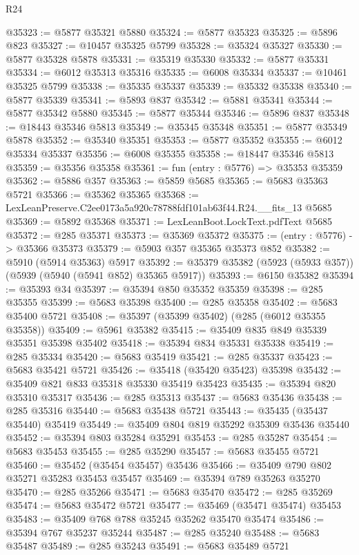 \begin{lexlean}{R24}
\begin{coremodule}
@35323 := @5877 @35321 @5880
@35324 := @5877 @35323
@35325 := @5896 @823
@35327 := @10457 @35325 @5799
@35328 := @35324 @35327
@35330 := @5877 @35328 @5878
@35331 := @35319 @35330
@35332 := @5877 @35331
@35334 := @6012 @35313 @35316
@35335 := @6008 @35334
@35337 := @10461 @35325 @5799
@35338 := @35335 @35337
@35339 := @35332 @35338
@35340 := @5877 @35339
@35341 := @5893 @837
@35342 := @5881 @35341
@35344 := @5877 @35342 @5880
@35345 := @5877 @35344
@35346 := @5896 @837
@35348 := @18443 @35346 @5813
@35349 := @35345 @35348
@35351 := @5877 @35349 @5878
@35352 := @35340 @35351
@35353 := @5877 @35352
@35355 := @6012 @35334 @35337
@35356 := @6008 @35355
@35358 := @18447 @35346 @5813
@35359 := @35356 @35358
@35361 := fun (entry : @5776) => @35353 @35359
@35362 := @5886 @357
@35363 := @5859 @5685
@35365 := @5683 @35363 @5721
@35366 := @35362 @35365
@35368 := LexLeanPreserve.C2ee0173a5a920c78788fdf101ab63f44.R24.__fits_13 @5685
@35369 := @5892 @35368
@35371 := LexLeanBoot.LockText.pdfText @5685
@35372 := @285 @35371
@35373 := @35369 @35372
@35375 := (entry : @5776) -> @35366 @35373
@35379 := @5903 @357 @35365 @35373 @852
@35382 := @5910 (@5914 @35363) @5917
@35392 := @35379 @35382 (@5923 (@5933 @357)) (@5939 (@5940 (@5941 @852) @35365 @5917))
@35393 := @6150 @35382
@35394 := @35393 @34
@35397 := @35394 @850 @35352 @35359
@35398 := @285 @35355
@35399 := @5683 @35398
@35400 := @285 @35358
@35402 := @5683 @35400 @5721
@35408 := @35397 (@35399 @35402) (@285 (@6012 @35355 @35358))
@35409 := @5961 @35382
@35415 := @35409 @835 @849 @35339 @35351 @35398 @35402
@35418 := @35394 @834 @35331 @35338
@35419 := @285 @35334
@35420 := @5683 @35419
@35421 := @285 @35337
@35423 := @5683 @35421 @5721
@35426 := @35418 (@35420 @35423) @35398
@35432 := @35409 @821 @833 @35318 @35330 @35419 @35423
@35435 := @35394 @820 @35310 @35317
@35436 := @285 @35313
@35437 := @5683 @35436
@35438 := @285 @35316
@35440 := @5683 @35438 @5721
@35443 := @35435 (@35437 @35440) @35419
@35449 := @35409 @804 @819 @35292 @35309 @35436 @35440
@35452 := @35394 @803 @35284 @35291
@35453 := @285 @35287
@35454 := @5683 @35453
@35455 := @285 @35290
@35457 := @5683 @35455 @5721
@35460 := @35452 (@35454 @35457) @35436
@35466 := @35409 @790 @802 @35271 @35283 @35453 @35457
@35469 := @35394 @789 @35263 @35270
@35470 := @285 @35266
@35471 := @5683 @35470
@35472 := @285 @35269
@35474 := @5683 @35472 @5721
@35477 := @35469 (@35471 @35474) @35453
@35483 := @35409 @768 @788 @35245 @35262 @35470 @35474
@35486 := @35394 @767 @35237 @35244
@35487 := @285 @35240
@35488 := @5683 @35487
@35489 := @285 @35243
@35491 := @5683 @35489 @5721

\end{coremodule}
\end{lexlean}
